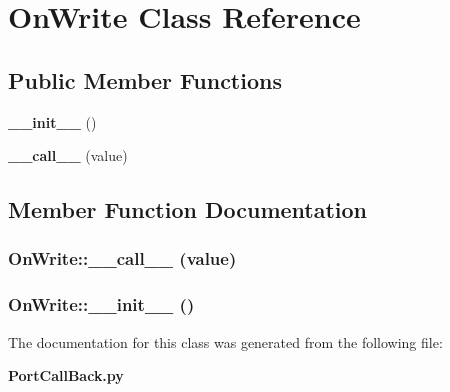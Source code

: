 \section{On\-Write Class Reference}
\label{classOnWrite}
\subsection*{Public Member Functions}
\begin{CompactItemize}
\item 
{\bf \_\-\_\-init\_\-\_\-} ()
\item 
{\bf \_\-\_\-call\_\-\_\-} (value)
\end{CompactItemize}


\subsection{Member Function Documentation}
\subsubsection{\setlength{\rightskip}{0pt plus 5cm}On\-Write::\_\-\_\-call\_\-\_\- (value)}\label{classOnWrite_OnWritea1}


\subsubsection{\setlength{\rightskip}{0pt plus 5cm}On\-Write::\_\-\_\-init\_\-\_\- ()}\label{classOnWrite_OnWritea0}




The documentation for this class was generated from the following file:\begin{CompactItemize}
\item 
{\bf Port\-Call\-Back.py}\end{CompactItemize}
